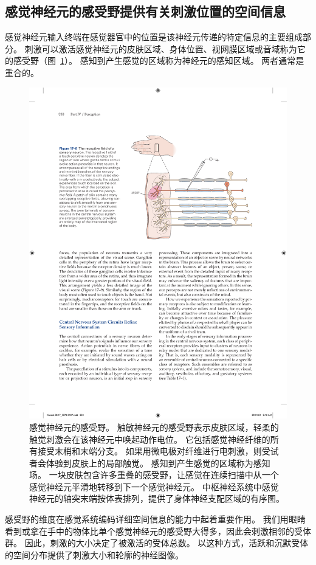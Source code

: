 \subsection{感觉神经元的感受野提供有关刺激位置的空间信息}

感觉神经元输入终端在感觉器官中的位置是该神经元传递的特定信息的主要组成部分。 
刺激可以激活感觉神经元的皮肤区域、身体位置、视网膜区域或音域称为它的感受野（图~\ref{fig:17_8}）。 
感知到产生感觉的区域称为神经元的感知区域。
两者通常是重合的。


\begin{figure}[htbp]
	\centering
	\includegraphics[width=0.7\linewidth]{chap17/fig_17_8}
	\caption{感觉神经元的感受野。
		触敏神经元的感受野表示皮肤区域，轻柔的触觉刺激会在该神经元中唤起动作电位。
		它包括感觉神经纤维的所有接受末梢和末端分支。
		如果用微电极对纤维进行电刺激，则受试者会体验到皮肤上的局部触觉。
		感知到产生感觉的区域称为感知场。
		一块皮肤包含许多重叠的感受野，让感觉在连续扫描中从一个感觉神经元平滑地转移到下一个感觉神经元。
		中枢神经系统中感觉神经元的轴突末端按体表排列，提供了身体神经支配区域的有序图。}
	\label{fig:17_8}
\end{figure}

感受野的维度在感觉系统编码详细空间信息的能力中起着重要作用。 
我们用眼睛看到或拿在手中的物体比单个感觉神经元的感受野大得多，因此会刺激相邻的受体群。 
因此，刺激的大小决定了被激活的受体总数。 
以这种方式，活跃和沉默受体的空间分布提供了刺激大小和轮廓的神经图像。


